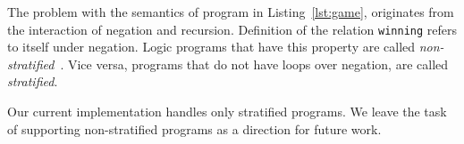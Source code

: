 The problem with the semantics of program in Listing~\ref{lst:game},
originates from the interaction of negation and recursion.
Definition of the relation \lstinline{winning} refers
to itself under negation.
Logic programs that have this property 
are called \emph{non-stratified}~\cite{przymusinski1989constructive}.
Vice versa, programs that do not have loops over negation, are called \emph{stratified}.


Our current implementation handles only stratified programs.
We leave the task of supporting non-stratified programs
as a direction for future work.

